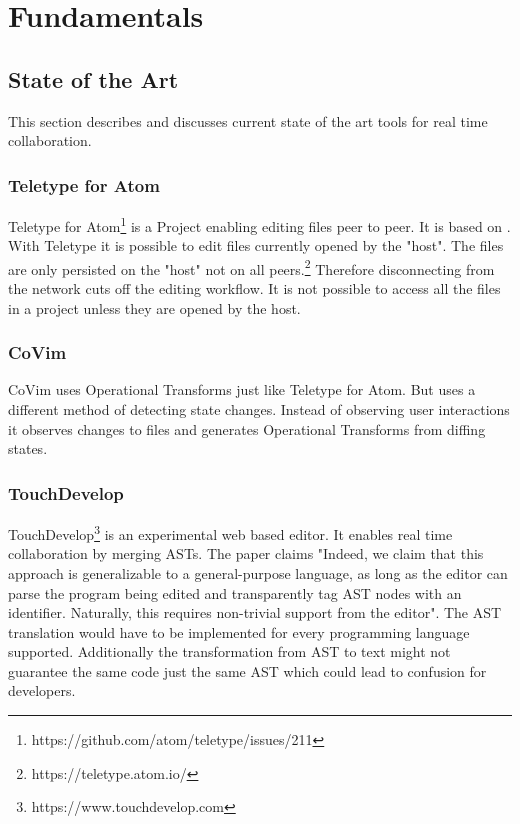 \chapter{Fundamentals}
\label{sec:fundamentals}

\section{State of the Art}

This section describes and discusses current state of the art tools for real time collaboration.

\subsection{Teletype for Atom}
Teletype for Atom\footnote{https://github.com/atom/teletype/issues/211} is a Project enabling editing files peer to peer. It is based on 	\cite{Oster:2006:DataconsistencyforP2Pcollaborativeediting} \cite{YuWeihai:2014} \cite{BriotUrsoShapiro:2016:HighResponsivenessGroupEditing}.
With Teletype it is possible to edit files currently opened by the "host". The files are only persisted on the "host" not on all peers.\footnote{https://teletype.atom.io/}
Therefore disconnecting from the network cuts off the editing workflow. It is not possible to access all the files in a project unless they are opened by the host. 
\subsection{CoVim}
CoVim\cite{ChoNgSun:2017:CoVim:Incorporatingreal-timecollaborationcapabilitiesintocomprehensivetexteditors} uses Operational Transforms just like Teletype for Atom. But uses a different method of detecting state changes. Instead of observing user interactions it observes changes to files and generates Operational Transforms from diffing states.
\subsection{TouchDevelop}
TouchDevelop\footnote{https://www.touchdevelop.com} is an experimental web based editor. It enables real time collaboration by merging ASTs. The paper claims "Indeed, we claim that this approach is generalizable to a
general-purpose language, as long as the editor can parse the
program being edited and transparently tag AST nodes with
an identifier. Naturally, this requires non-trivial support from
the editor".\cite{ProtzenkoBurckhardtMoskalMcClurg:2015:Implementingreal-timecollaborationinTouchDevelopusingASTmerges} The AST translation would have to be implemented for every programming language supported. Additionally the transformation from AST to text might not guarantee the same code just the same AST which could lead to confusion for developers. 

